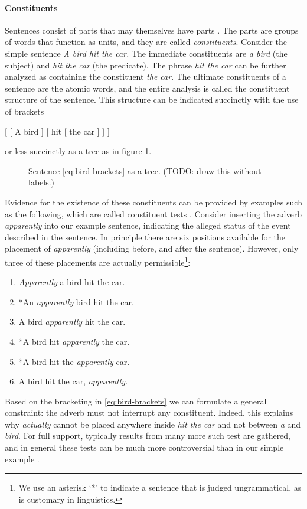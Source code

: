 \paragraph{Constituents} Sentences consist of parts that may themselves have parts \citep{huddleston2002grammar}. The parts are groups of words that function as units, and they are called \textit{constituents}. Consider the simple sentence \textit{A bird hit the car.} The immediate constituents are \textit{a bird} (the subject) and \textit{hit the car} (the predicate). The phrase \textit{hit the car} can be further analyzed as containing the constituent \textit{the car}. The ultimate constituents of a sentence are the atomic words, and the entire analysis is called the constituent structure of the sentence. This structure can be indicated succinctly with the use of brackets
\begin{center}
  [ [ A bird ] [ hit [ the car ] ] ]
  \label{eq:bird-brackets}
\end{center}
or less succinctly as a tree as in figure \ref{fig:bird-tree}.
\begin{figure}[h]{\textwidth}
  \center
  \caption{Sentence \ref{eq:bird-brackets} as a tree. (TODO: draw this without labels.)}
  \label{fig:bird-tree}
\end{figure}
Evidence for the existence of these constituents can be provided by examples such as the following, which are called constituent tests \citep{carnie2010constituent}. Consider inserting the adverb \textit{apparently} into our example sentence, indicating the alleged status of the event described in the sentence. In principle there are six positions available for the placement of \textit{apparently} (including before, and after the sentence). However, only three of these placements are actually permissible\footnote{We use an asterisk `*' to indicate a sentence that is judged ungrammatical, as is customary in linguistics.}:
\begin{enumerate}
  \item \textit{Apparently} a bird hit the car.
  \item *An \textit{apparently} bird hit the car.
  \item A bird \textit{apparently} hit the car.
  \item *A bird hit \textit{apparently} the car.
  \item *A bird hit the \textit{apparently} car.
  \item A bird hit the car, \textit{apparently}.
\end{enumerate}
Based on the bracketing in \ref{eq:bird-brackets} we can formulate a general constraint: the adverb must not interrupt any constituent. Indeed, this explains why \textit{actually} cannot be placed anywhere inside \textit{hit the car} and not between \textit{a} and \textit{bird}. For full support, typically results from many more such test are gathered, and in general these tests can be much more controversial than in our simple example \citep{carnie2010constituent}.

